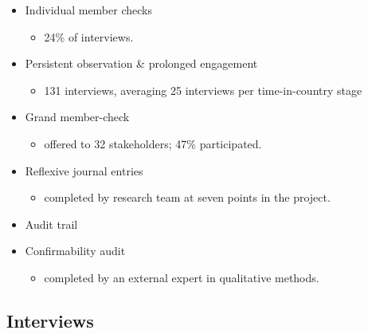 \documentclass[
  english,
]{book}
\providecommand{\tightlist}{%
  \setlength{\itemsep}{0pt}\setlength{\parskip}{0pt}}
\begin{document}
\begin{itemize}
\tightlist
\item
  Individual member checks

  \begin{itemize}
  \tightlist
  \item
    24\% of interviews.
  \end{itemize}
\item
  Persistent observation \& prolonged engagement

  \begin{itemize}
  \tightlist
  \item
    131 interviews, averaging 25 interviews per time-in-country stage
  \end{itemize}
\item
  Grand member-check

  \begin{itemize}
  \tightlist
  \item
    offered to 32 stakeholders; 47\% participated.
  \end{itemize}
\item
  Reflexive journal entries

  \begin{itemize}
  \tightlist
  \item
    completed by research team at seven points in the project.
  \end{itemize}
\item
  Audit trail
\item
  Confirmability audit

  \begin{itemize}
  \tightlist
  \item
    completed by an external expert in qualitative methods.
  \end{itemize}
\end{itemize}

\hypertarget{interviews}{%
\subsection{Interviews}\label{interviews}}
\end{document}
